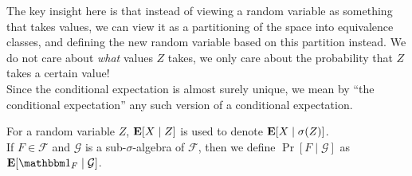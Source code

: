 The key insight here is that instead of viewing a random variable as something that takes values, we can view it as a partitioning of the space into equivalence classes, and defining the new random variable based on this partition instead. We do not care about \textit{what} values $Z$ takes, we only care about the probability that $Z$ takes a certain value!\\
Since the conditional expectation is almost surely unique, we mean by ``the conditional expectation'' any such version of a conditional expectation. 

For a random variable $Z$, $\textbf{E}[X\mid Z]$ is used to denote $\textbf{E}[X\mid\sigma(Z)]$.\\

If $F\in\mathcal{F}$ and $\mathcal{G}$ is a sub-$\sigma$-algebra of $\mathcal{F}$, then we define $\Pr[F\mid\mathcal{G}]$ as $\expec[\indic_F\mid\mathcal{G}]$.


